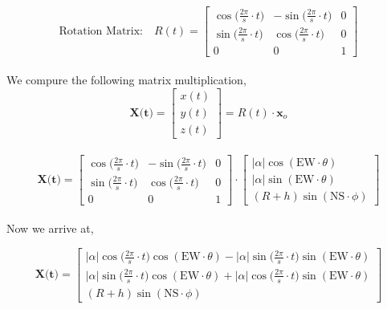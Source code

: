 \documentclass[11pt]{article}
\theoremstyle{definition}
\newcommand{\1}[1]{\mathbf{1} \left \{ #1 \right \}}
\begin{document}
\[\textrm{Rotation Matrix:} \quad R(t) = \begin{bmatrix}
\cos \big(\frac{2\pi}{s} \cdot t\big) & -\sin \big(\frac{2\pi}{s} \cdot t\big) & 0 \\ \sin \big(\frac{2\pi}{s} \cdot t\big) & \cos \big(\frac{2\pi}{s} \cdot t\big) & 0 \\ 0 & 0 & 1 \end{bmatrix}\] \\
We compure the following matrix multiplication,
\[\textbf{X(t)} = \begin{bmatrix} x(t) \\ y(t) \\ z(t) \end{bmatrix} = R(t) \cdot \textbf{x}_o\]
\\
\[\textbf{X(t)} = \begin{bmatrix}
\cos \big(\frac{2\pi}{s} \cdot t\big) & -\sin \big(\frac{2\pi}{s} \cdot t\big) & 0 \\ \sin \big(\frac{2\pi}{s} \cdot t\big) & \cos \big(\frac{2\pi}{s} \cdot t\big) & 0 \\ 0 & 0 & 1 \end{bmatrix} \cdot
\begin{bmatrix}
|\alpha| \cos (\textrm{EW} \cdot \theta) \\
|\alpha| \sin (\textrm{EW} \cdot \theta) \\
(R + h) \sin (\textrm{NS} \cdot \phi)
\end{bmatrix} \] \\
Now we arrive at,

\[\textbf{X(t)} = \begin{bmatrix}
|\alpha| \cos \big(\frac{2\pi}{s} \cdot t \big) \cos (\textrm{EW} \cdot \theta) - |\alpha| \sin \big(\frac{2\pi}{s} \cdot t \big) \sin (\textrm{EW} \cdot \theta) \\
|\alpha| \sin \big(\frac{2\pi}{s} \cdot t \big) \cos (\textrm{EW} \cdot \theta) + |\alpha| \cos \big(\frac{2\pi}{s} \cdot t \big) \sin (\textrm{EW} \cdot \theta) \\
(R + h) \sin (\textrm{NS} \cdot \phi)
\end{bmatrix} \]
\end{document}
